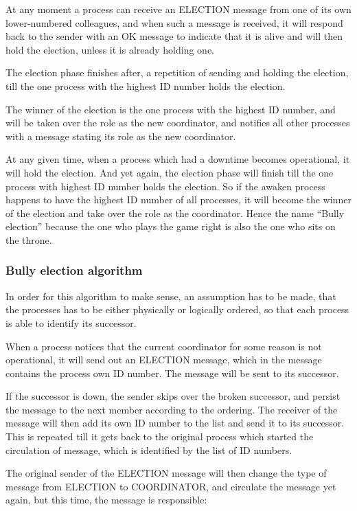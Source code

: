 At any moment a process can receive an ELECTION message from one of its own lower-numbered colleagues, and when such a message is received, it will respond back to the sender with an OK message to indicate that it is alive and will then hold the election, unless it is already holding one.

The election phase finishes after, a repetition of sending and holding the election, till the one process with the highest ID number holds the election.

The winner of the election is the one process with the highest ID number, and will be taken over the role as the new coordinator, and notifies all other processes with a message stating its role as the new coordinator.

At any given time, when a process which had a downtime becomes operational, it will hold the election.
And yet again, the election phase will finish till the one process with highest ID number holds the election. So if the awaken process happens to have the highest ID number of all processes, it will become the winner of the election and take over the role as the coordinator. Hence the name “Bully election” because the one who plays the game right is also the one who sits on the throne.

\subsubsection{Bully election algorithm}
In order for this algorithm to make sense, an assumption has to be made, that the processes has to be either physically or logically ordered, so that each process is able to identify its successor.

When a process notices that the current coordinator for some reason is not operational, it will send out an ELECTION message, which in the message contains the process own ID number. The message will be sent to its successor.

If the successor is down, the sender skips over the broken successor, and persist the message to the next member according to the ordering. The receiver of the message will then add its own ID number to the list and send it to its successor. This is repeated till it gets back to the original process which started the circulation of message, which is identified by the list of ID numbers.

The original sender of the ELECTION message will then change the type of message from ELECTION to COORDINATOR, and circulate the message yet again, but this time, the message is responsible:

